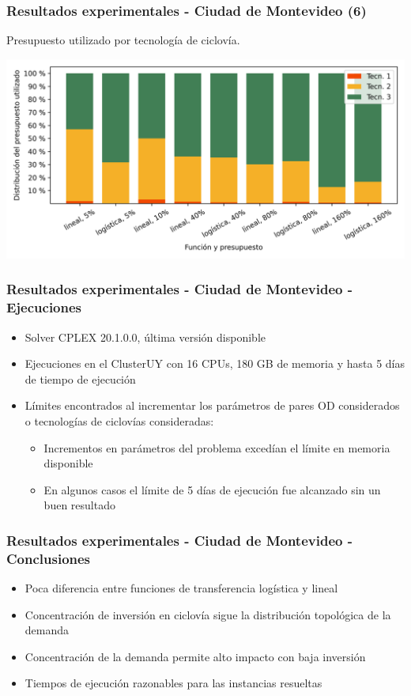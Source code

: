 \documentclass[aspectratio=43, 10pt]{beamer}
\begin{document}
\begin{frame}
    \frametitle{Resultados experimentales - Ciudad de Montevideo (6)}

    Presupuesto utilizado por tecnología de ciclovía.

    \includegraphics[width=\textwidth]{images/mdeo_budget_usage.png}
\end{frame}

\begin{frame}
    \frametitle{Resultados experimentales - Ciudad de Montevideo - Ejecuciones}

    \begin{itemize}
        \item{Solver CPLEX 20.1.0.0, última versión disponible}
        \item{Ejecuciones en el ClusterUY con 16 CPUs, 180 GB de memoria y hasta 5 días de tiempo de ejecución}
        \item{Límites encontrados al incrementar los parámetros de pares OD considerados o tecnologías de ciclovías consideradas:
            \begin{itemize}
                \item{Incrementos en parámetros del problema excedían el límite en memoria disponible}
                \item{En algunos casos el límite de 5 días de ejecución fue alcanzado sin un buen resultado}
            \end{itemize}
        }
    \end{itemize}
\end{frame}

\begin{frame}
    \frametitle{Resultados experimentales - Ciudad de Montevideo - Conclusiones}

    \begin{itemize}
        \item{Poca diferencia entre funciones de transferencia logística y lineal}
        \item{Concentración de inversión en ciclovía sigue la distribución topológica de la demanda}
        \item{Concentración de la demanda permite alto impacto con baja inversión}
        \item{Tiempos de ejecución razonables para las instancias resueltas}
    \end{itemize}
\end{frame}
\end{document}
